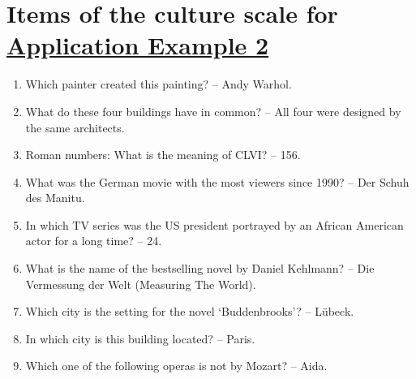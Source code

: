 \documentclass[doc,floatsintext,natbib]{apa7}
\begin{document}




\newpage
\appendix



%
%


\section{Items of the culture scale for \hyperref[sec:TutorialRasch]{Application Example 2}}
\label{sec:AppendixA}

\begin{enumerate}
\item Which painter created this painting? – Andy Warhol.
\item What do these four buildings have in common? – All four were designed by the same architects.
\item Roman numbers: What is the meaning of CLVI? – 156.
\item What was the German movie with the most viewers since 1990? – Der Schuh des Manitu.
\item In which TV series was the US president portrayed by an African American actor for a long time? – 24.
\item What is the name of the bestselling novel by Daniel Kehlmann? – Die Vermessung der Welt (Measuring The World).
\item Which city is the setting for the novel ‘Buddenbrooks’? – Lübeck.
\item In which city is this building located? – Paris.
\item Which one of the following operas is not by Mozart? – Aida.
\end{enumerate}
\end{document}
